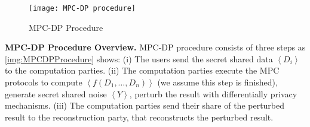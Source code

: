 \begin{figure}[htbp]
      \texttt{[image: MPC-DP procedure]}
      \centering
      \caption{MPC-DP Procedure}
      \label{img:MPCDPProcedure}
\end{figure}
\FloatBarrier

\textbf{MPC-DP Procedure Overview.}
MPC-DP procedure consists of three steps as \autoref{img:MPCDPProcedure} shows:
(i) The users send the secret shared data $\left\langle D_i\right\rangle $ to the computation parties.
(ii) The computation parties execute the MPC protocols to compute $\left\langle f\left(D_1,\ldots, D_n\right) \right\rangle $ (we assume this step is finished), generate secret shared noise $\left\langle Y\right\rangle $, perturb the result with differentially privacy mechanisms.
(iii) The computation parties send their share of the perturbed result to the reconstruction party, that reconstructs the perturbed result.





